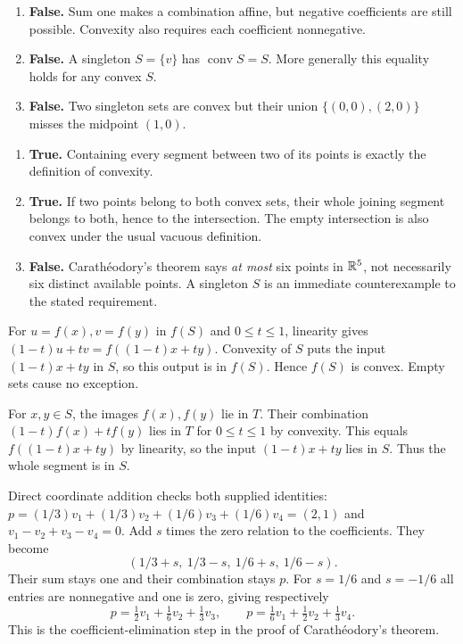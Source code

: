 \begin{enumerate}[label=(\alph*)]
\item \textbf{False.} Sum one makes a combination affine, but negative
coefficients are still possible. Convexity also requires each coefficient nonnegative.
\item \textbf{False.} A singleton $S=\{v\}$ has $\operatorname{conv}S=S$.
More generally this equality holds for any convex $S$.
\item \textbf{False.} Two singleton sets are convex but their union
$\{(0,0),(2,0)\}$ misses the midpoint $(1,0)$.
\end{enumerate}

\begin{enumerate}[label=(\alph*)]
\item \textbf{True.} Containing every segment between two of its points
is exactly the definition of convexity.
\item \textbf{True.} If two points belong to both convex sets, their
whole joining segment belongs to both, hence to the intersection. The empty
intersection is also convex under the usual vacuous definition.
\item \textbf{False.} Carath\'eodory's theorem says \emph{at most} six
points in $\mathbb{R}^5$, not necessarily six distinct available points.
A singleton $S$ is an immediate counterexample to the stated requirement.
\end{enumerate}

For $u=f(x),v=f(y)$ in $f(S)$ and $0\le t\le1$, linearity gives
$(1-t)u+tv=f((1-t)x+ty)$.
Convexity of $S$ puts the input $(1-t)x+ty$ in $S$, so this output is in
$f(S)$. Hence $f(S)$ is convex. Empty sets cause no exception.

For $x,y\in S$, the images $f(x),f(y)$ lie in $T$.
Their combination $(1-t)f(x)+tf(y)$ lies in $T$ for $0\le t\le1$ by
convexity. This equals $f((1-t)x+ty)$ by linearity, so the input
$(1-t)x+ty$ lies in $S$. Thus the whole segment is in $S$.

Direct coordinate addition checks both supplied identities:
$p=(1/3)v_1+(1/3)v_2+(1/6)v_3+(1/6)v_4=(2,1)$ and
$v_1-v_2+v_3-v_4=0$.
Add $s$ times the zero relation to the coefficients. They become
\[
 (1/3+s,\ 1/3-s,\ 1/6+s,\ 1/6-s).
\]
Their sum stays one and their combination stays $p$. For $s=1/6$ and
$s=-1/6$ all entries are nonnegative and one is zero, giving respectively
\[
 p=\tfrac12v_1+\tfrac16v_2+\tfrac13v_3,
 \qquad p=\tfrac16v_1+\tfrac12v_2+\tfrac13v_4.
\]
This is the coefficient-elimination step in the proof of Carath\'eodory's theorem.

